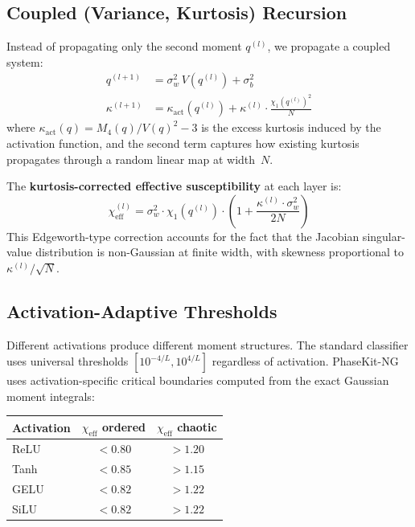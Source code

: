 \documentclass[10pt]{article}
\begin{document}
\subsection{Coupled (Variance, Kurtosis) Recursion}

Instead of propagating only the second moment $q^{(l)}$, we propagate a coupled system:
\begin{align}
q^{(l+1)} &= \sigma_w^2 \, V(q^{(l)}) + \sigma_b^2 \label{eq:ng-var} \\
\kappa^{(l+1)} &= \kappa_{\text{act}}(q^{(l)}) + \kappa^{(l)} \cdot \frac{\chi_1(q^{(l)})^2}{N} \label{eq:ng-kurt}
\end{align}
where $\kappa_{\text{act}}(q) = M_4(q) / V(q)^2 - 3$ is the excess kurtosis induced by the activation function, and the second term captures how existing kurtosis propagates through a random linear map at width~$N$.

The \textbf{kurtosis-corrected effective susceptibility} at each layer is:
\begin{equation}
\chi_{\text{eff}}^{(l)} = \sigma_w^2 \cdot \chi_1(q^{(l)}) \cdot \left(1 + \frac{\kappa^{(l)} \cdot \sigma_w^2}{2N}\right)
\label{eq:chi-eff}
\end{equation}
This Edgeworth-type correction accounts for the fact that the Jacobian singular-value distribution is non-Gaussian at finite width, with skewness proportional to $\kappa^{(l)}/\sqrt{N}$.

\subsection{Activation-Adaptive Thresholds}

Different activations produce different moment structures.
The standard classifier uses universal thresholds $[10^{-4/L}, 10^{4/L}]$ regardless of activation.
PhaseKit-NG uses activation-specific critical boundaries computed from the exact Gaussian moment integrals:

\begin{center}
\begin{tabular}{lcc}
\hline
Activation & $\chi_{\text{eff}}$ ordered & $\chi_{\text{eff}}$ chaotic \\
\hline
ReLU       & $< 0.80$ & $> 1.20$ \\
Tanh       & $< 0.85$ & $> 1.15$ \\
GELU       & $< 0.82$ & $> 1.22$ \\
SiLU       & $< 0.82$ & $> 1.22$ \\
\hline
\end{tabular}
\end{center}
\end{document}
